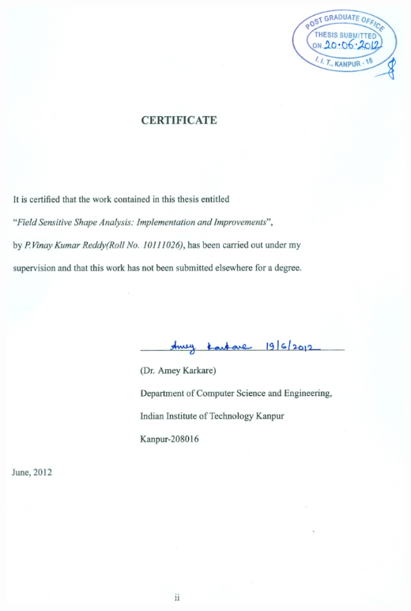 \documentclass[a4paper,12pt]{report}
\begin{document}
\newcommand{\upath}{\ensuremath{\mathcal{U}}}
\newcommand{\heap}{\ensuremath{\mathcal{H}}}
\newcommand{\fields}{\ensuremath{\mathcal{F}}}
\newcommand{\shape}{\mbox{shape}}
\newcommand{\nat}{\ensuremath{\mathcal{N}}}

\newcommand{\epsilonset}{\ensuremath{\{\epsilon\}}}
\newcommand{\epsilonpairset}{\ensuremath{\{\epsilon,\epsilon\}}}

\newcommand{\project}[2]{\ensuremath{#1\triangleright\!\!#2}}
\newcommand{\anysup}{\ensuremath{\ast}}

\newcommand{\DFM}[2]{\ensuremath{D_F[#1,#2]}}
\newcommand{\IFM}[2]{\ensuremath{I_F[#1,#2]}}

\newcommand{\remOne}[2]{\ensuremath{#1 \ominus #2}}
\newcommand{\remAll}[2]{\ensuremath{#1\uminus #2}}





\newpage

\newpage
\setcounter{page}{2}
% 	
\includegraphics{InitialPages/vinay_scan.eps}
\end{document}
